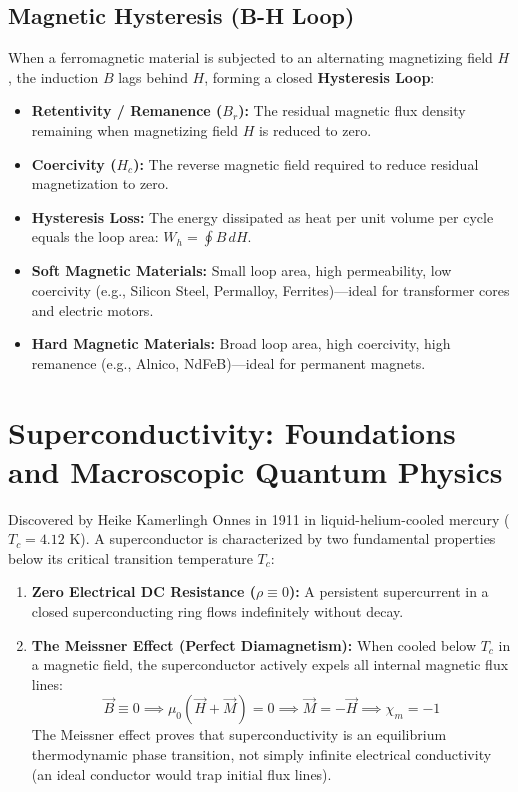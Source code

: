 \subsection{Magnetic Hysteresis (B-H Loop)}
When a ferromagnetic material is subjected to an alternating magnetizing field $H$, the induction $B$ lags behind $H$, forming a closed \textbf{Hysteresis Loop}:
\begin{itemize}[itemsep=2pt]
    \item \textbf{Retentivity / Remanence ($B_r$):} The residual magnetic flux density remaining when magnetizing field $H$ is reduced to zero.
    \item \textbf{Coercivity ($H_c$):} The reverse magnetic field required to reduce residual magnetization to zero.
    \item \textbf{Hysteresis Loss:} The energy dissipated as heat per unit volume per cycle equals the loop area: $W_h = \oint B \, dH$.
    \item \textbf{Soft Magnetic Materials:} Small loop area, high permeability, low coercivity (e.g., Silicon Steel, Permalloy, Ferrites)---ideal for transformer cores and electric motors.
    \item \textbf{Hard Magnetic Materials:} Broad loop area, high coercivity, high remanence (e.g., Alnico, NdFeB)---ideal for permanent magnets.
\end{itemize}

\section{Superconductivity: Foundations and Macroscopic Quantum Physics}
Discovered by Heike Kamerlingh Onnes in 1911 in liquid-helium-cooled mercury ($T_c = 4.12\text{ K}$). A superconductor is characterized by two fundamental properties below its critical transition temperature $T_c$:
\begin{enumerate}[itemsep=2pt]
    \item \textbf{Zero Electrical DC Resistance ($\rho \equiv 0$):} A persistent supercurrent in a closed superconducting ring flows indefinitely without decay.
    \item \textbf{The Meissner Effect (Perfect Diamagnetism):} When cooled below $T_c$ in a magnetic field, the superconductor actively expels all internal magnetic flux lines:
    \begin{equation}
    \vec{B} \equiv 0 \implies \mu_0(\vec{H} + \vec{M}) = 0 \implies \vec{M} = -\vec{H} \implies \chi_m = -1
    \end{equation}
    The Meissner effect proves that superconductivity is an equilibrium thermodynamic phase transition, not simply infinite electrical conductivity (an ideal conductor would trap initial flux lines).
\end{enumerate}

